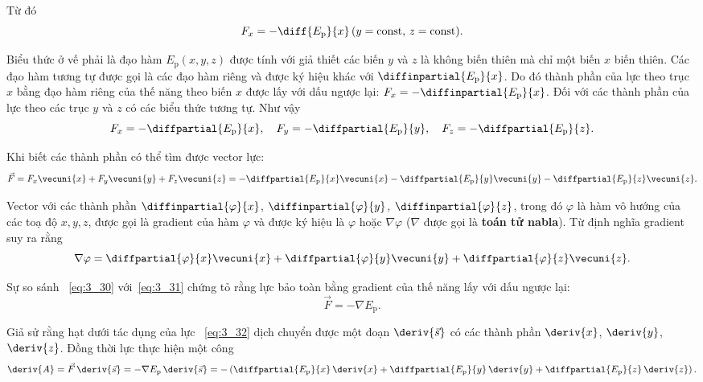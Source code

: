 \noindent
Từ đó
\begin{equation*}
F_x = -\diff{E_{\text{p}}}{x}\, (y=\text{const},\, z=\text{const}).
\end{equation*}

\noindent
Biểu thức ở vế phải là đạo hàm $E_{\text{p}}(x,y,z)$ được tính với giả thiết các biến $y$ và $z$ là không biến thiên mà chỉ một biến $x$ biến thiên. Các đạo hàm tương tự được gọi là các đạo hàm riêng và được ký hiệu khác với $\diffinpartial{E_{\text{p}}}{x}$. Do đó thành phần của lực theo trục $x$ bằng đạo hàm riêng của thế năng theo biến $x$ được lấy với dấu ngược lại: $F_x=-\diffinpartial{E_{\text{p}}}{x}$. Đối với các thành phần của lực theo các trục  $y$ và $z$ có các biểu thức tương tự. Như vậy
\begin{equation}\label{eq:3_29}
F_x = -\diffpartial{E_{\text{p}}}{x},\quad F_y = -\diffpartial{E_{\text{p}}}{y},\quad F_z = -\diffpartial{E_{\text{p}}}{z}.
\end{equation}

Khi biết các thành phần có thể tìm được vector lực:
\begin{equation}\label{eq:3_30}
\vec{F} = F_x\vecuni{x} + F_y\vecuni{y} + F_z\vecuni{z} =
-\diffpartial{E_{\text{p}}}{x}\vecuni{x} - \diffpartial{E_{\text{p}}}{y}\vecuni{y} -\diffpartial{E_{\text{p}}}{z}\vecuni{z}.
\end{equation}

Vector với các thành phần $\diffinpartial{\varphi}{x}$,  $\diffinpartial{\varphi}{y}$, $\diffinpartial{\varphi}{z}$, trong đó $\varphi$ là hàm vô hướng của các toạ độ  $x,y,z$, được gọi là gradient của hàm $\varphi$ và được ký hiệu là $\varphi$ hoặc $\nabla\varphi$ ($\nabla$ được gọi là  \textbf{toán tử nabla}). Từ định nghĩa gradient suy ra rằng
\begin{equation}\label{eq:3_31}
\nabla\varphi = \diffpartial{\varphi}{x}\vecuni{x} + \diffpartial{\varphi}{y}\vecuni{y} + \diffpartial{\varphi}{z}\vecuni{z}.
\end{equation}

Sự so sánh ~\eqref{eq:3_30} với~\eqref{eq:3_31} chứng tỏ rằng lực bảo toàn bằng gradient của thế năng lấy với dấu ngược lại:
\begin{equation}\label{eq:3_32}
\vec{F} = -\nabla E_{\text{p}}.
\end{equation}

Giả sử rằng hạt dưới tác dụng của lực ~\eqref{eq:3_32} dịch chuyển được một đoạn $\deriv{\vec{s}}$ có các thành phần $\deriv{x}$, $\deriv{y}$, $\deriv{z}$. Đồng thời lực thực hiện một công 
\begin{equation*}
\deriv{A} = \vec{F}\,\deriv{\vec{s}} = -\nabla E_{\text{p}}\,\deriv{\vec{s}} = - \left(\diffpartial{E_{\text{p}}}{x}\,\deriv{x} + \diffpartial{E_{\text{p}}}{y}\,\deriv{y} +  \diffpartial{E_{\text{p}}}{z}\,\deriv{z}\right).
\end{equation*}

